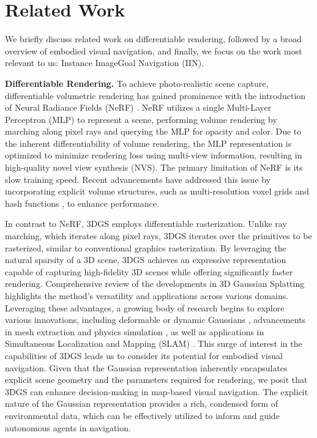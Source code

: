 \section{Related Work}

We briefly discuss related work on differentiable rendering, followed by a broad overview of embodied visual navigation, and finally, we focus on the work most relevant to us: Instance ImageGoal Navigation (IIN).

\textbf{Differentiable Rendering.} To achieve photo-realistic scene capture, differentiable volumetric rendering has gained prominence with the introduction of Neural Radiance Fields (NeRF) \cite{mildenhall2020nerf}. NeRF utilizes a single Multi-Layer Perceptron (MLP) to represent a scene, performing volume rendering by marching along pixel rays and querying the MLP for opacity and color. Due to the inherent differentiability of volume rendering, the MLP representation is optimized to minimize rendering loss using multi-view information, resulting in high-quality novel view synthesis (NVS). The primary limitation of NeRF is its slow training speed. Recent advancements have addressed this issue by incorporating explicit volume structures, such as multi-resolution voxel grids \cite{fridovich2022plenoxels, liu2020neural, sun2022direct} and hash functions \cite{muller2022instant}, to enhance performance.


In contrast to NeRF, 3DGS \cite{kerbl3Dgaussians} employs differentiable rasterization. Unlike ray marching, which iterates along pixel rays, 3DGS iterates over the primitives to be rasterized, similar to conventional graphics rasterization. By leveraging the natural sparsity of a 3D scene, 3DGS achieves an expressive representation capable of capturing high-fidelity 3D scenes while offering significantly faster rendering. 
Comprehensive review of the developments in 3D Gaussian Splatting \cite{chen2024survey} highlights the method's versatility and applications across various domains.
Leveraging these advantages, a growing body of research begins to explore various innovations, including deformable or dynamic Gaussians \cite{luiten2023dynamic, wu20234dgaussians, yang2023deformable3dgs}, advancements in mesh extraction and physics simulation \cite{feng2024gaussian,xie2023physgaussian,guedon2023sugar}, as well as applications in Simultaneous Localization and Mapping (SLAM) \cite{keetha2023splatam, matsuki2023gaussian, yugay2023gaussianslam}. This surge of interest in the capabilities of 3DGS leads us to consider its potential for embodied visual navigation. Given that the Gaussian representation inherently encapsulates explicit scene geometry and the parameters required for rendering, we posit that 3DGS can enhance decision-making in map-based visual navigation. The explicit nature of the Gaussian representation provides a rich, condensed form of environmental data, which can be effectively utilized to inform and guide autonomous agents in navigation.

